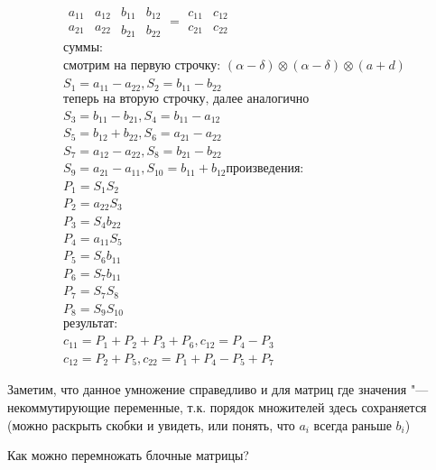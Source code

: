\begin{gather*}
    \begin{matrix}
        a_{11} & a_{12} \\
        a_{21} & a_{22}
    \end{matrix}
    \begin{matrix}
        b_{11} & b_{12} \\
        b_{21} & b_{22}
    \end{matrix} = 
    \begin{matrix}
        c_{11} & c_{12} \\
        c_{21} & c_{22}
    \end{matrix}\\
    \text{суммы:} \\
    \text{смотрим на первую строчку: $(\alpha - \delta) \otimes (\alpha - \delta) \otimes (a + d)$} \\
    S_1 = a_{11} - a_{22}, S_2 = b_{11} - b_{22} \\
    \text{теперь на вторую строчку, далее аналогично} \\
    S_3 = b_{11} - b_{21}, S_4 = b_{11} - a_{12} \\
    S_5 = b_{12} + b_{22}, S_6 = a_{21} - a_{22} \\
    S_7 = a_{12} - a_{22}, S_8 = b_{21} - b_{22} \\
    S_9 = a_{21} - a_{11}, S_{10} = b_{11} + b_{12}
    \text{произведения:} \\
    P_1 = S_1 S_2    \\
    P_2 = a_{22} S_3 \\
    P_3 = S_4 b_{22} \\
    P_4 = a_{11} S_5 \\
    P_5 = S_6 b_{11} \\
    P_6 = S_7 b_{11} \\
    P_7 = S_7 S_8    \\
    P_8 = S_9 S_{10} \\
    \text{результат:} \\
    c_{11} = P_1 + P_2 + P_3 + P_6, c_{12} = P_4 - P_3 \\
    c_{12} = P_2 + P_5, c_{22} = P_1 + P_4 - P_5 + P_7
\end{gather*}

Заметим, что данное умножение справедливо и для матриц где значения "--- некоммутирующие 
переменные, т.к. порядок множителей здесь сохраняется 
(можно раскрыть скобки и увидеть, или понять, что $a_i$ всегда раньше $b_i$)

Как можно перемножать блочные матрицы?

